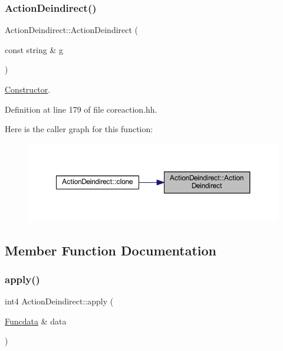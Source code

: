\subsubsection{\texorpdfstring{ActionDeindirect()}{ActionDeindirect()}}
{\footnotesize\ttfamily Action\+Deindirect\+::\+Action\+Deindirect (\begin{DoxyParamCaption}\item[{const string \&}]{g }\end{DoxyParamCaption})\hspace{0.3cm}{\ttfamily [inline]}}



\mbox{\hyperlink{class_constructor}{Constructor}}. 



Definition at line 179 of file coreaction.\+hh.

Here is the caller graph for this function\+:
\nopagebreak
\begin{figure}[H]
\begin{center}
\leavevmode
\includegraphics[width=350pt]{class_action_deindirect_aaf631db039ca1c1ce5b029620b95a633_icgraph}
\end{center}
\end{figure}


\subsection{Member Function Documentation}
\mbox{\label{class_action_deindirect_a4f54f89989ab5700bdac440960ed6fcf}} 
\subsubsection{\texorpdfstring{apply()}{apply()}}
{\footnotesize\ttfamily int4 Action\+Deindirect\+::apply (\begin{DoxyParamCaption}\item[{\mbox{\hyperlink{class_funcdata}{Funcdata}} \&}]{data }\end{DoxyParamCaption})\hspace{0.3cm}{\ttfamily [virtual]}}



